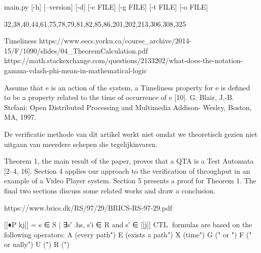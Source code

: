 \hoofdstuk{}






main.py [-h] [--version] [-d] [-c FILE] [-g FILE] [-t FILE] [-o FILE]





32,38,40,44,61,75,78,79,81,82,85,86,201,202,213,306,308,325\




Timeliness
https://www.eecs.yorku.ca/course_archive/2014-15/F/1090/slides/04_TheoremCalculation.pdf
https://math.stackexchange.com/questions/2133202/what-does-the-notation-gamma-vdash-phi-mean-in-mathematical-logic


Assume that e is an action of the system, a Timeliness property for e is defined
to be a property related to the time of occurrence of e [10]. G. Blair, J.-B. Stefani: Open Distributed Processing and Multimedia Addison-
Wesley, Boston, MA, 1997.




De verificatie methode van dit artikel werkt niet omdat we theoretisch gezien niet uitgaan van meerdere schepen die tegelijkinvaren.

Theorem 1, the main
result of the paper, proves that a QTA is a Test Automata [2–4, 16]. Section 4
applies our approach to the verification of throughput in an example of a Video
Player system. Section 5 presents a proof for Theorem 1. The final two sections
discuss some related works and draw a conclusion.


https://www.brics.dk/RS/97/29/BRICS-RS-97-29.pdf

[[♦P kj]] = {s ∈ S | ∃s′
	.hs, s′i ∈ R and s′ ∈ [[j]]}
CTL formulas are based on the following operators:
A (\on every path")
E (\there exists a path")
X (\next time")
G (\globally" or \always")
F (\eventually" or \nally")
U (\until")
R (\release")

